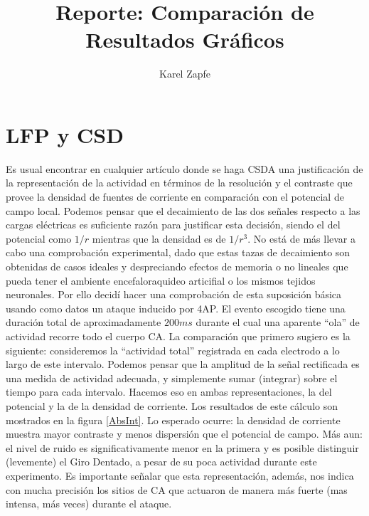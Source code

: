\documentclass{article}
\title{Reporte: Comparación de Resultados Gráficos}
\author{Karel Zapfe}
\begin{document}
\maketitle

\section{LFP y CSD}

Es usual encontrar en cualquier artículo donde se haga CSDA una justificación de la
representación de la actividad en términos de la resolución y el contraste que provee la densidad de fuentes de corriente en comparación con el potencial de campo local. Podemos pensar que el decaimiento de las dos señales respecto a las cargas eléctricas es suficiente razón para justificar esta decisión, siendo el del potencial como $1/r$ mientras que la densidad es de $1/r^3$. No está de más llevar a cabo una comprobación experimental, dado que estas tazas de decaimiento son obtenidas de casos ideales y despreciando efectos de memoria o no lineales que pueda tener el ambiente encefaloraquideo articifial o los mismos tejidos neuronales. Por ello decidí hacer una comprobación de esta suposición básica usando como datos un ataque inducido por 4AP. El evento escogido tiene una duración total de  aproximadamente $200 ms$ durante el cual una aparente ``ola'' de actividad recorre todo el cuerpo CA. La comparación que primero sugiero es la siguiente: consideremos la ``actividad total'' registrada en cada electrodo a lo largo de este intervalo. Podemos pensar que la amplitud de la señal rectificada es una medida de actividad adecuada, y simplemente sumar (integrar) sobre el tiempo para cada intervalo. Hacemos eso en ambas representaciones, la del potencial y la de la densidad de corriente. Los resultados de este cálculo son mostrados en la figura \ref{AbsInt}. Lo esperado ocurre: la densidad de corriente muestra mayor contraste y menos dispersión que el potencial de campo. Más aun: el nivel de ruido es significativamente menor en la primera y es posible distinguir (levemente) el Giro Dentado, a pesar de su poca actividad durante este experimento. Es importante señalar que esta representación, además, nos indica con mucha precisión los sitios de CA que actuaron de manera más fuerte (mas intensa, más veces) durante el ataque.
\end{document}
